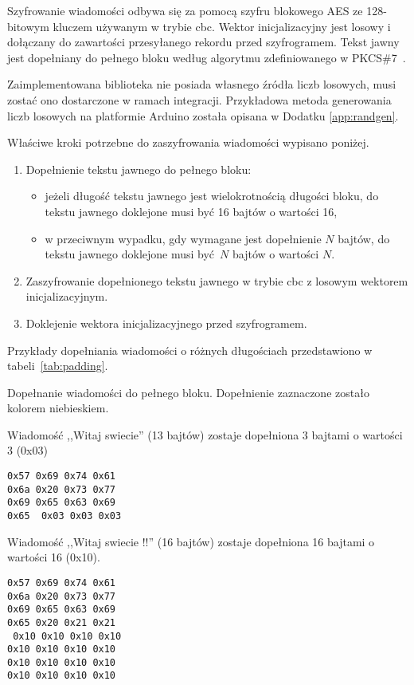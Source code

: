 Szyfrowanie wiadomości odbywa się za pomocą szyfru blokowego AES ze 128-bitowym kluczem używanym w trybie \gls{cbc}. Wektor inicjalizacyjny jest losowy i dołączany do zawartości przesyłanego rekordu przed szyfrogramem. Tekst jawny jest dopełniany do pełnego bloku według algorytmu zdefiniowanego w PKCS\#7~\cite{kaliski1998pkcs}.

Zaimplementowana biblioteka nie posiada własnego źródła liczb losowych, musi zostać ono dostarczone w ramach integracji. Przykładowa metoda generowania liczb losowych na platformie Arduino została opisana w Dodatku \ref{app:randgen}.

Właściwe kroki potrzebne do zaszyfrowania wiadomości wypisano poniżej.

\begin{enumerate}
\item Dopełnienie tekstu jawnego do pełnego bloku:
\begin{itemize}
\item jeżeli długość tekstu jawnego jest wielokrotnością długości bloku, do tekstu jawnego doklejone musi być 16 bajtów o wartości 16,
\item w przeciwnym wypadku, gdy wymagane jest dopełnienie $ N $ bajtów, do tekstu jawnego doklejone musi być $ N $ bajtów o wartości $ N $.
\end{itemize}
\item Zaszyfrowanie dopełnionego tekstu jawnego w trybie \gls{cbc} z losowym wektorem inicjalizacyjnym.
\item Doklejenie wektora inicjalizacyjnego przed szyfrogramem.
\end{enumerate}

Przykłady dopełniania wiadomości o różnych długościach przedstawiono w tabeli~\ref{tab:padding}.

\begin{table}[t]
\centering
\caption{Dopełnanie wiadomości do pełnego bloku. Dopełnienie zaznaczone zostało kolorem niebieskiem.}
Wiadomość ,,Witaj swiecie'' (13 bajtów) zostaje dopełniona 3 bajtami o wartości 3 (0x03)

\texttt{0x57 0x69 0x74 0x61\\
0x6a 0x20 0x73 0x77\\
0x69 0x65 0x63 0x69\\
0x65 {\color[rgb]{0,0,1} 0x03 0x03 0x03}}

Wiadomość ,,Witaj swiecie !!'' (16 bajtów) zostaje dopełniona 16 bajtami o wartości 16 (0x10).

\texttt{0x57 0x69 0x74 0x61\\
0x6a 0x20 0x73 0x77\\
0x69 0x65 0x63 0x69\\
0x65 0x20 0x21 0x21\\
{\color[rgb]{0,0,1}
0x10 0x10 0x10 0x10\\
0x10 0x10 0x10 0x10\\
0x10 0x10 0x10 0x10\\
0x10 0x10 0x10 0x10\\
}
}

\label{tab:padding}
\end{table}

